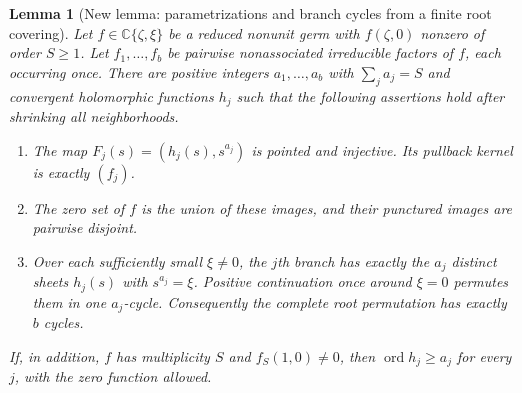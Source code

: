 \documentclass[11pt,oneside]{report}
\newtheorem{lemma}[theorem]{Lemma}
\theoremstyle{definition}
\numberwithin{equation}{section}
\newcommand{\C}{\mathbb C}
\newcommand{\ord}{\operatorname{ord}}
\begin{document}
\begin{lemma}[New lemma: parametrizations and branch cycles from a finite root covering]
\label{J14:lem:root-cover}
Let $f\in\C\{\zeta,\xi\}$ be a reduced nonunit germ with
$f(\zeta,0)$ nonzero of order $S\geq1$. Let
$f_1,\ldots,f_b$ be pairwise nonassociated irreducible factors of $f$,
each occurring once. There are positive integers $a_1,\ldots,a_b$
with $\sum_j a_j=S$ and convergent holomorphic functions $h_j$ such
that the following assertions hold after shrinking all neighborhoods.
\begin{enumerate}
\item The map $F_j(s)=(h_j(s),s^{a_j})$ is pointed and injective.
Its pullback kernel is exactly $(f_j)$.
\item The zero set of $f$ is the union of these images, and their
punctured images are pairwise disjoint.
\item Over each sufficiently small $\xi\ne0$, the $j$th branch has
exactly the $a_j$ distinct sheets $h_j(s)$ with $s^{a_j}=\xi$.
Positive continuation once around $\xi=0$ permutes them in one
$a_j$-cycle. Consequently the complete root permutation has exactly
$b$ cycles.
\end{enumerate}
If, in addition, $f$ has multiplicity $S$ and $f_S(1,0)\ne0$, then
$\ord h_j\geq a_j$ for every $j$, with the zero function allowed.
\end{lemma}
\end{document}
